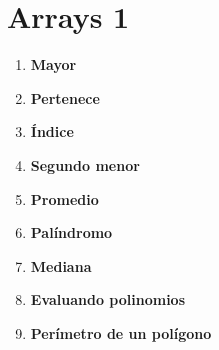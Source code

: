 \section{Arrays 1}
\begin{enumerate}
    \item \textbf{Mayor}\\
    
    
    \item \textbf{Pertenece}\\
    
     
    \item \textbf{Índice}\\
    
     
    \item \textbf{Segundo menor}\\
    

    \item \textbf{Promedio}\\
    

    \item \textbf{Palíndromo}
    

    \item \textbf{Mediana}\\
    

    \item \textbf{Evaluando polinomios}\\
    
    
    \item \textbf{Perímetro de un polígono}\\
    
\end{enumerate}

\newpage
